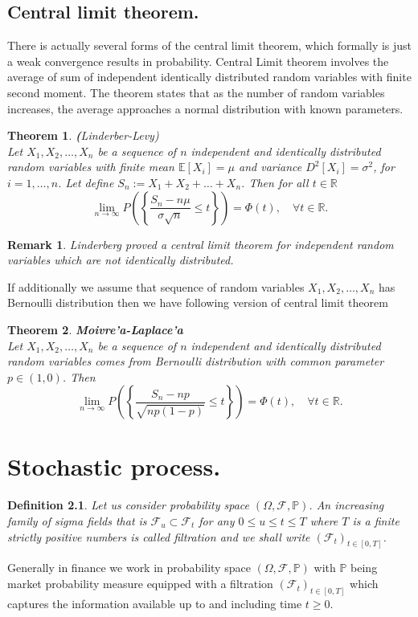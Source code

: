\documentclass{book}
\newtheorem{definition}{Definition}[section]
\newtheorem{theorem}{Theorem}[section]
\newtheorem{remark}{Remark}[section]
\begin{document}
\section{Central limit theorem.}
There is actually several forms of the central limit theorem, which formally is just a weak convergence results in probability.
Central Limit theorem involves the average of sum of independent identically distributed random variables with finite second moment. The theorem states that as the number of random variables increases, the average approaches a normal distribution with known parameters. 
\begin{theorem}\textbf({Linderber-Levy})\\
Let $X_{1}, X_{2},\dots, X_{n}$ be a sequence of $n$ independent and identically distributed random variables with finite mean $\mathbb{E}[X_{i}]=\mu$ and variance $D^{2}[X_{i}]=\sigma^{2}$, for $i=1,\dots,n$. Let define $S_{n}:=X_{1}+X_{2}+\dots+X_{n}$. Then for all $t\in\mathbb{R}$ 
 \begin{equation}
 \lim_{n\to\infty} P\left(\left\{ \frac{S_{n}-n\mu}{\sigma\sqrt{n}}\leq t\right\}\right)=\Phi(t),\quad \forall t\in\mathbb{R}.
 \end{equation}
\end{theorem}
\begin{remark}
Linderberg proved a central limit theorem for independent random variables which are not identically distributed.
\end{remark}
If additionally we assume that sequence of random variables $X_{1}, X_{2},\dots, X_{n}$ has Bernoulli distribution then we have following version of central limit theorem
\begin{theorem}\textbf{Moivre'a-Laplace'a}\\
Let $X_{1}, X_{2},\dots, X_{n}$ be a sequence of $n$ independent and identically distributed random variables comes from Bernoulli distribution with common parameter $p\in(1,0)$. Then
\begin{equation}
\lim_{n\to\infty} P\left(\left\{ \frac{S_{n}-np}{\sqrt{np(1-p)}}\leq t\right\}\right)=\Phi(t),\quad \forall t\in \mathbb{R}.
\end{equation}
\end{theorem}
\chapter{Stochastic process.}
\begin{definition}
Let us consider probability space $(\varOmega,\mathcal{F},\mathbb{P})$. 
An increasing family of sigma fields that is $\mathcal{F}_{u}\subset\mathcal{F}_{t}$ for any $0\leq u\leq t\leq T$ where $T$ is a finite strictly positive numbers is called filtration and we shall write $(\mathcal{F}_{t})_{t\in[0,T]}$. 
\end{definition}
Generally in finance we work in probability space $(\varOmega,\mathcal{F},\mathbb{P})$ with $\mathbb{P}$ being market probability measure equipped with a filtration $(\mathcal{F}_{t})_{t\in[0,T]}$
which captures the information available up to and including time $t\geq 0$. 
\end{document}
